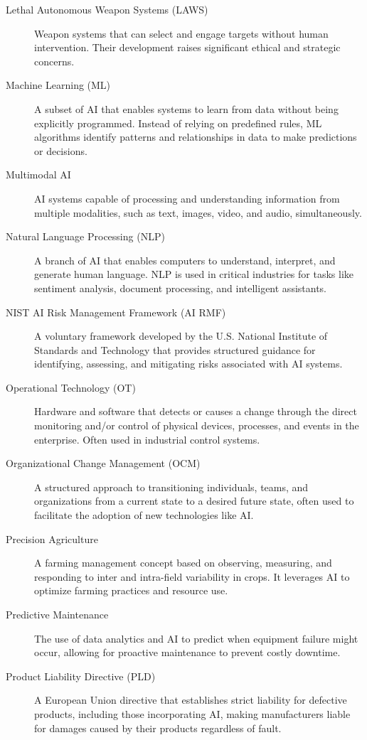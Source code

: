 \begin{description}
    \item[Lethal Autonomous Weapon Systems (LAWS)] Weapon systems that can select and engage targets without human intervention. Their development raises significant ethical and strategic concerns.
    \item[Machine Learning (ML)] A subset of AI that enables systems to learn from data without being explicitly programmed. Instead of relying on predefined rules, ML algorithms identify patterns and relationships in data to make predictions or decisions.
    \item[Multimodal AI] AI systems capable of processing and understanding information from multiple modalities, such as text, images, video, and audio, simultaneously.
    \item[Natural Language Processing (NLP)] A branch of AI that enables computers to understand, interpret, and generate human language. NLP is used in critical industries for tasks like sentiment analysis, document processing, and intelligent assistants.
    \item[NIST AI Risk Management Framework (AI RMF)] A voluntary framework developed by the U.S. National Institute of Standards and Technology that provides structured guidance for identifying, assessing, and mitigating risks associated with AI systems.
    \item[Operational Technology (OT)] Hardware and software that detects or causes a change through the direct monitoring and/or control of physical devices, processes, and events in the enterprise. Often used in industrial control systems.
    \item[Organizational Change Management (OCM)] A structured approach to transitioning individuals, teams, and organizations from a current state to a desired future state, often used to facilitate the adoption of new technologies like AI.
    \item[Precision Agriculture] A farming management concept based on observing, measuring, and responding to inter and intra-field variability in crops. It leverages AI to optimize farming practices and resource use.
    \item[Predictive Maintenance] The use of data analytics and AI to predict when equipment failure might occur, allowing for proactive maintenance to prevent costly downtime.
    \item[Product Liability Directive (PLD)] A European Union directive that establishes strict liability for defective products, including those incorporating AI, making manufacturers liable for damages caused by their products regardless of fault.

\end{description}
